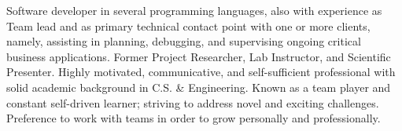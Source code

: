 

\begin{cvsummary}

Software developer in several programming languages, also with experience as Team lead and as primary technical contact point with one or more clients, namely, assisting in planning, debugging, and supervising ongoing critical business applications. 
Former Project Researcher, Lab Instructor, and Scientific Presenter. %
Highly motivated, communicative, and self-sufficient %
professional with solid academic background in C.S. \& Engineering. %
Known as a team player %
and constant self-driven learner; 
striving to address novel and exciting challenges. %
Preference to work with %
teams in order to grow personally and professionally.
\end{cvsummary}
